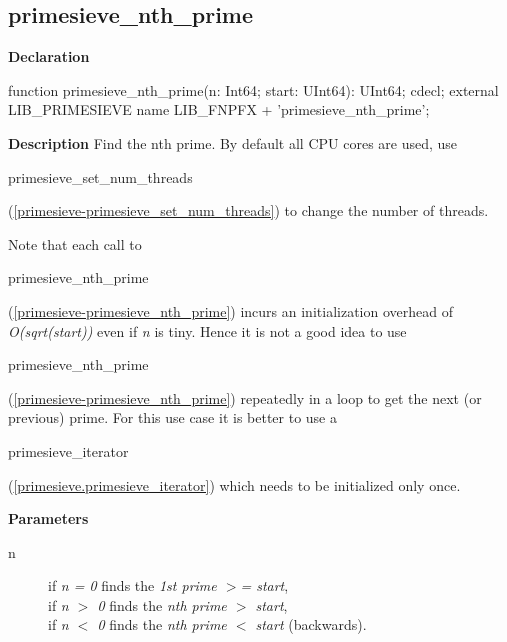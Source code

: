 \documentclass{report}
\newif\ifpdf
\begin{document}
\subsection*{primesieve{\_}nth{\_}prime}
\fi
\label{primesieve-primesieve_nth_prime}
\begin{list}{}{
\setlength{\itemindent}{0cm}
\setlength{\listparindent}{0cm}
\setlength{\leftmargin}{\evensidemargin}
\addtolength{\leftmargin}{\tmplength}
\settowidth{\labelsep}{X}
\addtolength{\leftmargin}{\labelsep}
\setlength{\labelwidth}{\tmplength}
}
\item[\textbf{Declaration}\hfill]
\ifpdf
\begin{flushleft}
\fi
\begin{ttfamily}
function primesieve{\_}nth{\_}prime(n: Int64; start: UInt64): UInt64; cdecl; external LIB{\_}PRIMESIEVE name LIB{\_}FNPFX + 'primesieve{\_}nth{\_}prime';\end{ttfamily}

\ifpdf
\end{flushleft}
\fi

\par
\item[\textbf{Description}]
Find the nth prime. By default all CPU cores are used, use \begin{ttfamily}primesieve{\_}set{\_}num{\_}threads\end{ttfamily}(\ref{primesieve-primesieve_set_num_threads}) to change the number of threads.

Note that each call to \begin{ttfamily}primesieve{\_}nth{\_}prime\end{ttfamily}(\ref{primesieve-primesieve_nth_prime}) incurs an initialization overhead of \textit{O(sqrt(start))} even if \textit{n} is tiny. Hence it is not a good idea to use \begin{ttfamily}primesieve{\_}nth{\_}prime\end{ttfamily}(\ref{primesieve-primesieve_nth_prime}) repeatedly in a loop to get the next (or previous) prime. For this use case it is better to use a \begin{ttfamily}primesieve{\_}iterator\end{ttfamily}(\ref{primesieve.primesieve_iterator}) which needs to be initialized only once.

\par
\item[\textbf{Parameters}]
\begin{description}
\item[n] if \textit{n = 0} finds the \textit{1st prime {$>$}= start},\\{} if \textit{n {$>$} 0} finds the \textit{nth prime {$>$} start},\\{} if \textit{n {$<$} 0} finds the \textit{nth prime {$<$} start} (backwards).
\end{description}


\end{list}
\ifpdf
\end{document}
